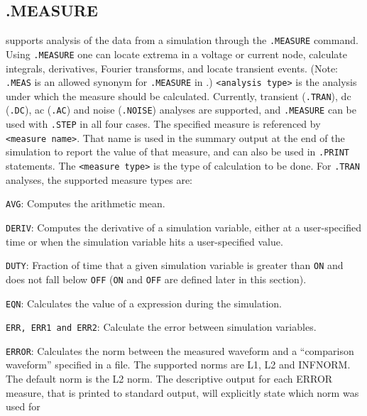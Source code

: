 {{\subsection{.MEASURE}
 
\label{measure}
\Xyce{} supports analysis of the data from a simulation through the
\texttt{.MEASURE} command.  Using \texttt{.MEASURE} one can locate extrema in a
voltage or current node, calculate integrals, derivatives, Fourier transforms,
and locate transient events. (Note: \texttt{.MEAS} is an allowed synonym for 
\texttt{.MEASURE} in \Xyce{}.)
\texttt{<analysis type>} is the analysis under which the measure should be calculated.  
Currently,  transient (\texttt{.TRAN}), dc (\texttt{.DC}), ac (\texttt{.AC})
and noise (\texttt{.NOISE}) analyses
are supported, and \texttt{.MEASURE} can be used with \texttt{.STEP} in all four cases.
The specified measure is referenced by \texttt{<measure name>}.  That name is used 
in the summary output at the end of the simulation to report the value of that
measure, and can also be used in \texttt{.PRINT} statements.  The
\texttt{<measure type>} is the type of calculation to be done.  For \texttt{.TRAN}
analyses, the supported measure types are:
\begin{XyceItemize}
\item \texttt{AVG}: Computes the arithmetic mean.
\item \texttt{DERIV}: Computes the derivative of a simulation variable, either at a user-specified
    time or when the simulation variable hits a user-specified value.
\item \texttt{DUTY}: Fraction of time that a given simulation variable is greater than \texttt{ON} and 
    does not fall below \texttt{OFF} (\texttt{ON} and \texttt{OFF} are defined later in this section).
 \item \texttt{EQN}: Calculates the value of a \Xyce{} expression during the simulation.
 \item \texttt{ERR, ERR1 and ERR2}: Calculate the error between simulation variables.
 \item \texttt{ERROR}: Calculates the norm between the measured waveform and a ``comparison
    waveform'' specified in a file.  The supported norms are L1, L2 and INFNORM.  The
    default norm is the L2 norm.  The descriptive output for each ERROR measure,
    that is printed to standard output, will explicitly state which norm  was used for 

\end{XyceItemize}}}
